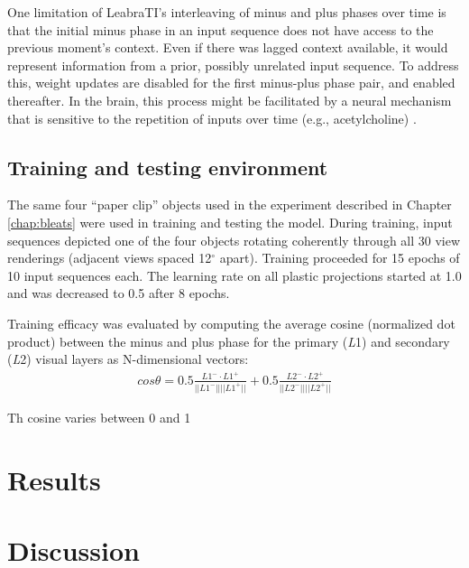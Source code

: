 \documentclass[dwyatte_dissertation.tex]{subfiles}
\begin{document}
One limitation of LeabraTI's interleaving of minus and plus phases over time is that the initial minus phase in an input sequence does not have access to the previous moment's  context. Even if there was lagged context available, it would represent information from a prior, possibly unrelated input sequence. To address this, weight updates are disabled for the first minus-plus phase pair, and enabled thereafter. In the brain, this process might be facilitated by a neural mechanism that is sensitive to the repetition of inputs over time (e.g., acetylcholine) \cite{ThielHensonMorrisEtAl01,ThielHensonDolan02}.

\subsection{Training and testing environment}
The same four ``paper clip'' objects used in the experiment described in Chapter \ref{chap:bleats} were used in training and testing the model. During training, input sequences depicted one of the four objects rotating coherently through all 30 view renderings (adjacent views spaced 12$^\circ$ apart). Training proceeded for 15 epochs of 10 input sequences each. The learning rate on all plastic projections started at 1.0 and was decreased to 0.5 after 8 epochs. 

Training efficacy was evaluated by computing the average cosine (normalized dot product) between the minus and plus phase for the primary (\textit{L}1) and secondary (\textit{L}2) visual layers as N-dimensional vectors:
\begin{align*}
cos \theta = 0.5\frac{L1^- \cdot{} L1^+}{||L1^-||||L1^+||} + 0.5\frac{L2^- \cdot{} L2^+}{||L2^-||||L2^+||}
\end{align*}

Th cosine varies between 0 and 1 



\section{Results}

\section{Discussion}



\end{document}
